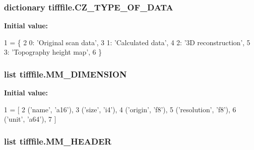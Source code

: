 \hypertarget{namespacetifffile_ac7e3e8843aae0f8ea8127281a91e7f31}{
\subsubsection[{C\-Z\-\_\-\-T\-Y\-P\-E\-\_\-\-O\-F\-\_\-\-D\-A\-T\-A}]{\setlength{\rightskip}{0pt plus 5cm}dictionary tifffile.\-C\-Z\-\_\-\-T\-Y\-P\-E\-\_\-\-O\-F\-\_\-\-D\-A\-T\-A}}\label{namespacetifffile_ac7e3e8843aae0f8ea8127281a91e7f31}
{\bfseries Initial value\-:}
\begin{DoxyCode}
1 = \{
2     0: \textcolor{stringliteral}{'Original scan data'},
3     1: \textcolor{stringliteral}{'Calculated data'},
4     2: \textcolor{stringliteral}{'3D reconstruction'},
5     3: \textcolor{stringliteral}{'Topography height map'},
6 \}
\end{DoxyCode}
\hypertarget{namespacetifffile_a073beeac6dac3b611fc1285512669e33}{
\subsubsection[{M\-M\-\_\-\-D\-I\-M\-E\-N\-S\-I\-O\-N}]{\setlength{\rightskip}{0pt plus 5cm}list tifffile.\-M\-M\-\_\-\-D\-I\-M\-E\-N\-S\-I\-O\-N}}\label{namespacetifffile_a073beeac6dac3b611fc1285512669e33}
{\bfseries Initial value\-:}
\begin{DoxyCode}
1 = [
2     (\textcolor{stringliteral}{'name'}, \textcolor{stringliteral}{'a16'}),
3     (\textcolor{stringliteral}{'size'}, \textcolor{stringliteral}{'i4'}),
4     (\textcolor{stringliteral}{'origin'}, \textcolor{stringliteral}{'f8'}),
5     (\textcolor{stringliteral}{'resolution'}, \textcolor{stringliteral}{'f8'}),
6     (\textcolor{stringliteral}{'unit'}, \textcolor{stringliteral}{'a64'}),
7 ]
\end{DoxyCode}
\hypertarget{namespacetifffile_abbea883513007cc59d50161a9a0ee053}{
\subsubsection[{M\-M\-\_\-\-H\-E\-A\-D\-E\-R}]{\setlength{\rightskip}{0pt plus 5cm}list tifffile.\-M\-M\-\_\-\-H\-E\-A\-D\-E\-R}}\label{namespacetifffile_abbea883513007cc59d50161a9a0ee053}

